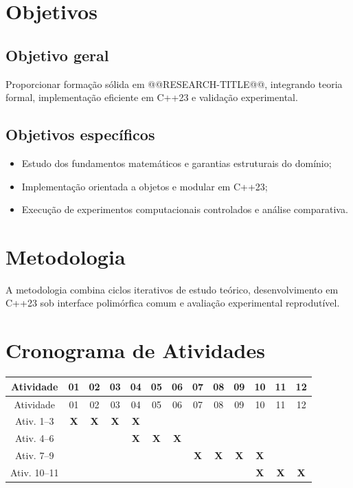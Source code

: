 \documentclass{amsart}
\begin{document}
\section{Objetivos}
\subsection{Objetivo geral}
Proporcionar formação sólida em @@RESEARCH-TITLE@@, integrando teoria formal, implementação eficiente em C++23 e validação experimental.

\subsection{Objetivos específicos}
\begin{itemize}
    \item Estudo dos fundamentos matemáticos e garantias estruturais do domínio;
    \item Implementação orientada a objetos e modular em C++23;
    \item Execução de experimentos computacionais controlados e análise comparativa.
\end{itemize}

\section{Metodologia}
A metodologia combina ciclos iterativos de estudo teórico, desenvolvimento em C++23 sob interface polimórfica comum e avaliação experimental reprodutível.

\section{Cronograma de Atividades}
\begin{longtable}{|c|c|c|c|c|c|c|c|c|c|c|c|c|}
\hline
Atividade   &01&02&03&04&05&06&07&08&09&10&11&12\\ \hline
\endfirsthead
\hline
Atividade   &01&02&03&04&05&06&07&08&09&10&11&12\\ \hline
\endhead
Ativ. 1--3 &\textbf{\textsf{X}}&\textbf{\textsf{X}}&\textbf{\textsf{X}}&\textbf{\textsf{X}}&&&&&&&&\\ \hline
Ativ. 4--6 &&&&\textbf{\textsf{X}}&\textbf{\textsf{X}}&\textbf{\textsf{X}}&&&&&&\\ \hline
Ativ. 7--9 &&&&&&&\textbf{\textsf{X}}&\textbf{\textsf{X}}&\textbf{\textsf{X}}&\textbf{\textsf{X}}&&\\ \hline
Ativ. 10--11 &&&&&&&&&&\textbf{\textsf{X}}&\textbf{\textsf{X}}&\textbf{\textsf{X}}\\ \hline
\end{longtable}
\end{document}
